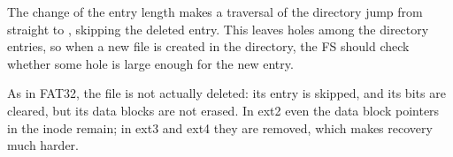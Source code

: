 The change of the entry length makes a traversal of the directory jump from  straight to , skipping the deleted entry. This leaves holes among the directory entries, so when a new file is created in the directory, the FS should check whether some hole is large enough for the new entry.

\begin{keypoint}
  As in FAT32, the file is not actually deleted: its entry is skipped, and its bits are cleared, but its data blocks are not erased. In ext2 even the data block pointers in the inode remain; in ext3 and ext4 they are removed, which makes recovery much harder.
\end{keypoint}
